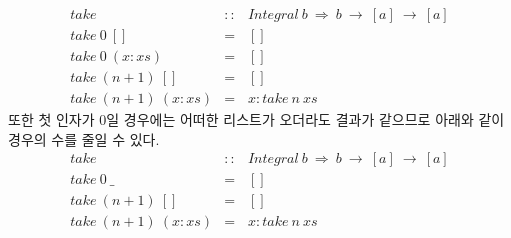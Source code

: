 \begin{itemize}
\begin{enumerate}
    \[\begin{array}{lcl}
      take & :: & Integral~b~\Rightarrow~b~\rightarrow~[a]~\rightarrow~[a]\\
      take~0~[]           & = & [] \\
      take~0~(x : xs)     & = & [] \\
      take~(n+1)~[]       & = & [] \\
      take~(n+1)~(x : xs) & = & x : take~n~xs
    \end{array}\]
    또한 첫 인자가 0일 경우에는 어떠한 리스트가 오더라도 결과가 같으므로
    아래와 같이 경우의 수를 줄일 수 있다.
    \[\begin{array}{lcl}
      take & :: & Integral~b~\Rightarrow~b~\rightarrow~[a]~\rightarrow~[a]\\
      take~0~\_           & = & [] \\
      take~(n+1)~[]       & = & [] \\
      take~(n+1)~(x : xs) & = & x : take~n~xs
    \end{array}\]
  \end{enumerate}


\end{itemize}
